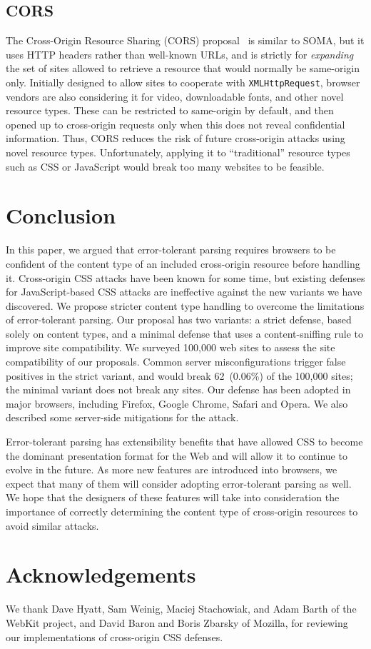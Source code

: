 \documentclass{acm_proc_article-sp}
\begin{document}
\subsection{CORS}
The Cross-Origin Resource Sharing (CORS) proposal~\cite{cors} is
similar to SOMA, but it uses HTTP headers rather than well-known URLs,
and is strictly for \emph{expanding} the set of sites allowed to
retrieve a resource that would normally be same-origin only.
Initially designed to allow sites to cooperate with
\texttt{XMLHttpRequest}, browser vendors are also considering it for
video, downloadable fonts, and other novel resource types.  These can
be restricted to same-origin by default, and then opened up to
cross-origin requests only when this does not reveal confidential
information.  Thus, CORS reduces the risk of future cross-origin
attacks using novel resource types.  Unfortunately, applying it to
“traditional” resource types such as CSS or JavaScript would break too
many websites to be feasible.

\section{Conclusion} \label{sec:conclusion}
In this paper, we argued that error-tolerant parsing requires browsers to be
confident of the content type of an included cross-origin resource before
handling it. Cross-origin CSS attacks have been known for some time, but
existing defenses for JavaScript-based CSS attacks are ineffective against
the new variants we have discovered. We propose stricter content type handling
to overcome the limitations of error-tolerant parsing. Our proposal has
two variants: a strict defense, based solely on content
types, and a minimal defense that uses a content-sniffing rule to improve
site compatibility.  We surveyed 100,000 web sites to assess the site
compatibility of our proposals.  Common server misconfigurations
trigger false positives in the strict variant, and would break
62~(0.06\%) of the 100,000 sites; the minimal variant does not break
any sites.  Our defense has been adopted in major browsers, including
Firefox, Google Chrome, Safari and Opera.
We also described some server-side mitigations for the attack.

Error-tolerant parsing has extensibility benefits that have allowed CSS to
become the dominant presentation format for the Web and will allow it to
continue to evolve in the future. As more new features are introduced into
browsers, we expect that many of them will consider adopting error-tolerant parsing as well. We hope that the designers of these features will
take into consideration the importance of correctly determining the content
type of cross-origin resources to avoid similar attacks.

\section*{Acknowledgements}

We thank Dave Hyatt, Sam Weinig, Maciej Stachowiak, and Adam Barth of
the WebKit project, and David Baron and Boris Zbarsky of Mozilla, for
reviewing our implementations of cross-origin CSS defenses.



\end{document}
